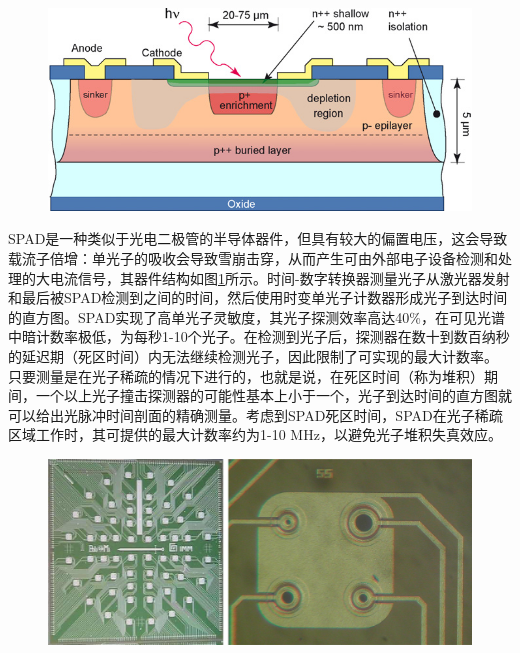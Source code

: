 \documentclass[master]{shtthesis}             %
\begin{document}
\begin{figure}[!tb]
  \centering
  \includegraphics[width=\textwidth]{figure/spad_pixel_struct.jpg}
  \label{fig:spad_pixel}
\end{figure}

SPAD是一种类似于光电二极管的半导体器件，但具有较大的偏置电压，这会导致载流子倍增：单光子的吸收会导致雪崩击穿，从而产生可由外部电子设备检测和处理的大电流信号，其器件结构如图\ref{fig:spad_pixel}所示\citep{zappa2007principles}。时间-数字转换器测量光子从激光器发射和最后被SPAD检测到之间的时间，然后使用时变单光子计数器形成光子到达时间的直方图\citep{becker2005advanced}。SPAD实现了高单光子灵敏度，其光子探测效率高达40\%，在可见光谱中暗计数率极低，为每秒1-10个光子。在检测到光子后，探测器在数十到数百纳秒的延迟期（死区时间）内无法继续检测光子，因此限制了可实现的最大计数率。
只要测量是在光子稀疏的情况下进行的，也就是说，在死区时间（称为堆积）期间，一个以上光子撞击探测器的可能性基本上小于一个，光子到达时间的直方图就可以给出光脉冲时间剖面的精确测量。考虑到SPAD死区时间，SPAD在光子稀疏区域工作时，其可提供的最大计数率约为1-10 MHz，以避免光子堆积失真效应。

\begin{figure}[!tb]
  \centering
  \includegraphics[width=\textwidth]{figure/spad_array.jpg}
  \label{fig:spad_array}
\end{figure}
\end{document}
